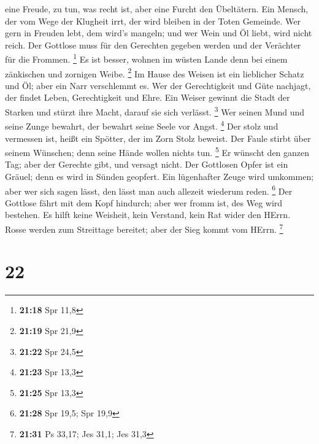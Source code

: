 eine Freude, zu tun, was recht ist, aber eine Furcht den Übeltätern.
 Ein Mensch, der vom Wege der Klugheit irrt, der wird
bleiben in der Toten Gemeinde.  Wer gern in Freuden lebt,
dem wird's mangeln; und wer Wein und Öl liebt, wird nicht reich.
 Der Gottlose muss für den Gerechten gegeben werden und der
Verächter für die Frommen. \footnote{\textbf{21:18} Spr 11,8}
 Es ist besser, wohnen im wüsten Lande denn bei einem
zänkischen und zornigen Weibe. \footnote{\textbf{21:19} Spr 21,9}
 Im Hause des Weisen ist ein lieblicher Schatz und Öl; aber
ein Narr verschlemmt es.  Wer der Gerechtigkeit und Güte
nachjagt, der findet Leben, Gerechtigkeit und Ehre.  Ein
Weiser gewinnt die Stadt der Starken und stürzt ihre Macht, darauf sie
sich verlässt. \footnote{\textbf{21:22} Spr 24,5}  Wer
seinen Mund und seine Zunge bewahrt, der bewahrt seine Seele vor Angst.
\footnote{\textbf{21:23} Spr 13,3}  Der stolz und vermessen
ist, heißt ein Spötter, der im Zorn Stolz beweist.  Der
Faule stirbt über seinem Wünschen; denn seine Hände wollen nichts tun.
\footnote{\textbf{21:25} Spr 13,3}  Er wünscht den ganzen
Tag; aber der Gerechte gibt, und versagt nicht.  Der
Gottlosen Opfer ist ein Gräuel; denn es wird in Sünden geopfert.
 Ein lügenhafter Zeuge wird umkommen; aber wer sich sagen
lässt, den lässt man auch allezeit wiederum reden. \footnote{\textbf{21:28}
  Spr 19,5; Spr 19,9}  Der Gottlose fährt mit dem Kopf
hindurch; aber wer fromm ist, des Weg wird bestehen.  Es
hilft keine Weisheit, kein Verstand, kein Rat wider den HErrn.
 Rosse werden zum Streittage bereitet; aber der Sieg kommt
vom HErrn. \footnote{\textbf{21:31} Ps 33,17; Jes 31,1; Jes 31,3}

\hypertarget{section-9}{%
\section{22}\label{section-9}}

